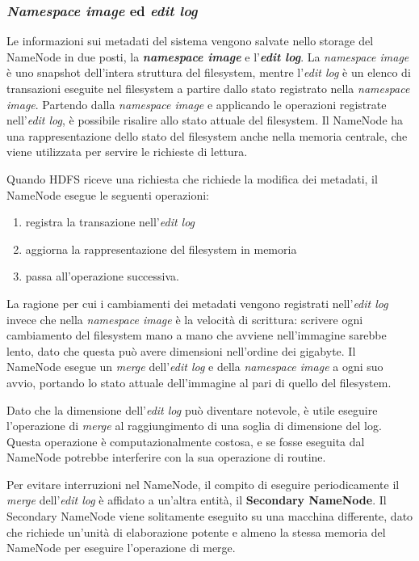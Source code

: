 \documentclass[italian,a4paper, twoside, 12pt]{report}
\providecommand{\tightlist}{%
  \setlength{\itemsep}{0pt}\setlength{\parskip}{0pt}}
\begin{document}
\subsubsection{\texorpdfstring{\emph{Namespace image} ed \emph{edit
log}}{Namespace image ed edit log}}\label{namespace-image-ed-edit-log}

Le informazioni sui metadati del sistema vengono salvate nello storage
del NameNode in due posti, la \emph{\textbf{namespace image}} e
l'\emph{\textbf{edit log}}. La \emph{namespace image} è uno snapshot
dell'intera struttura del filesystem, mentre l'\emph{edit log} è un
elenco di transazioni eseguite nel filesystem a partire dallo stato
registrato nella \emph{namespace image}. Partendo dalla \emph{namespace
image} e applicando le operazioni registrate nell'\emph{edit log}, è
possibile risalire allo stato attuale del filesystem. Il NameNode ha una
rappresentazione dello stato del filesystem anche nella memoria
centrale, che viene utilizzata per servire le richieste di lettura.

Quando HDFS riceve una richiesta che richiede la modifica dei metadati,
il NameNode esegue le seguenti operazioni:

\begin{enumerate}
\tightlist
\item
  registra la transazione nell'\emph{edit log}
\item
  aggiorna la rappresentazione del filesystem in memoria
\item
  passa all'operazione successiva.
\end{enumerate}

La ragione per cui i cambiamenti dei metadati vengono registrati
nell'\emph{edit log} invece che nella \emph{namespace image} è la
velocità di scrittura: scrivere ogni cambiamento del filesystem mano a
mano che avviene nell'immagine sarebbe lento, dato che questa può avere
dimensioni nell'ordine dei gigabyte. Il NameNode esegue un \emph{merge}
dell'\emph{edit log} e della \emph{namespace image} a ogni suo avvio,
portando lo stato attuale dell'immagine al pari di quello del
filesystem.

Dato che la dimensione dell'\emph{edit log} può diventare notevole, è
utile eseguire l'operazione di \emph{merge} al raggiungimento di una
soglia di dimensione del log. Questa operazione è computazionalmente
costosa, e se fosse eseguita dal NameNode potrebbe interferire con la
sua operazione di routine.

Per evitare interruzioni nel NameNode, il compito di eseguire
periodicamente il \emph{merge} dell'\emph{edit log} è affidato a
un'altra entità, il \textbf{Secondary NameNode}. Il Secondary NameNode
viene solitamente eseguito su una macchina differente, dato che richiede
un'unità di elaborazione potente e almeno la stessa memoria del NameNode
per eseguire l'operazione di merge.
\end{document}
